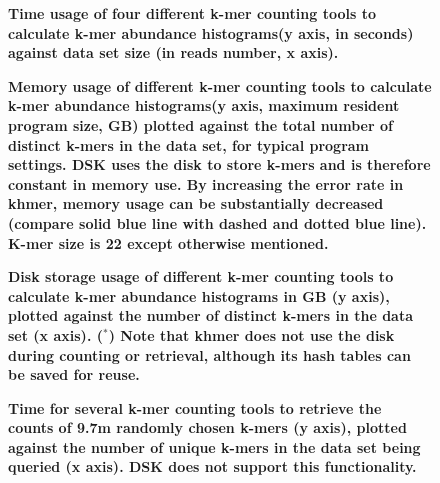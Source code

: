 \documentclass[10pt]{article}
\begin{document}



\begin{figure}[!ht]
\caption{\bf Time usage of four different k-mer counting tools to calculate k-mer 
abundance histograms(y axis, in seconds) against data set size (in reads number, x axis).}
\label{fig:cmp_time}
\end{figure}

\begin{figure}[!ht]
\caption{\bf Memory usage of different k-mer counting tools to calculate k-mer abundance 
histograms(y axis, maximum resident program size, GB) plotted against the total number 
of distinct k-mers in the data set, for typical program settings. DSK uses the disk to 
store k-mers and is therefore constant in memory use. By increasing the error rate in 
khmer, memory usage can be substantially decreased (compare solid blue line with dashed 
and dotted blue line). K-mer size is 22 except otherwise mentioned.}
\label{fig:cmp_memory}
\end{figure}

\begin{figure}[!ht]
\caption{\bf Disk storage usage of different k-mer counting tools to calculate k-mer 
abundance histograms in GB (y axis),
plotted against the number of distinct k-mers in the data set (x axis).  ($^*$) Note 
that khmer does not use the disk during counting or retrieval, although its hash 
tables can be saved for reuse.}
\label{fig:cmp_disk}
\end{figure}

\begin{figure}[!ht]
\caption{\bf Time for several k-mer counting tools to retrieve the counts of 9.7m randomly 
chosen k-mers (y axis), plotted against the number of unique k-mers in the data set 
being queried (x axis).  DSK does not support this functionality.}
\label{fig:cmp_count}
\end{figure}
\end{document}
